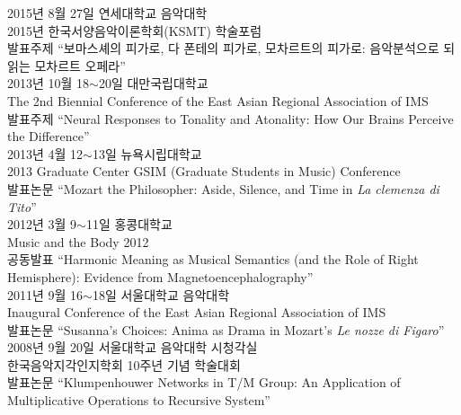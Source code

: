 \documentclass[dvipdfmx,a4paper]{article}
\begin{document}
  \noindent 2015년 8월 27일 연세대학교 음악대학\\
  2015년 한국서양음악이론학회(KSMT) 학술포럼\\
  발표주제 “보마스셰의 피가로, 다 폰테의 피가로, 모차르트의 피가로: 음악분석으로 되읽는 모차르트 오페라”\\
  
  \noindent 2013년 10월 18$\sim$20일 대만국립대학교\\
  The 2nd Biennial Conference of the East Asian Regional Association of IMS\\
  발표주제 “Neural Responses to Tonality and Atonality: How Our Brains Perceive the Difference”\\
  
  \noindent 2013년 4월 12$\sim$13일 뉴욕시립대학교\\
  2013 Graduate Center GSIM (Graduate Students in Music) Conference\\
  발표논문 “Mozart the Philosopher: Aside, Silence, and Time in \textit{La clemenza di Tito}”\\
  
  \noindent 2012년 3월 9$\sim$11일 홍콩대학교\\
  Music and the Body 2012\\
  공동발표 “Harmonic Meaning as Musical Semantics (and the Role of Right Hemisphere): Evidence from Magnetoencephalography”\\
  
  \noindent 2011년 9월 16$\sim$18일 서울대학교 음악대학\\
  Inaugural Conference of the East Asian Regional Association of IMS\\
  발표논문 “Susanna’s Choices: Anima as Drama in Mozart’s \textit{Le nozze di Figaro}”\\
  
  
  
  \noindent 2008년 9월 20일 서울대학교 음악대학 시청각실\\
  한국음악지각인지학회 10주년 기념 학술대회\\
  발표논문 “Klumpenhouwer Networks in T/M Group: An Application of Multiplicative Operations to Recursive System”\\
  
\end{document}
